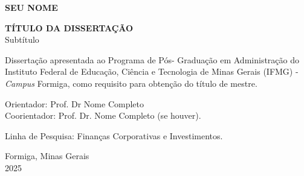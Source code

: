 \newpage




\thispagestyle{empty}

\begin{center}
  \vspace{3cm}
  \sc \large \textbf{SEU NOME} 
  
  \vspace{5cm}
  \large \textbf{TÍTULO DA DISSERTAÇÃO} \\
  Subtítulo
  
  \vspace{2cm}
  \begin{flushright}
  \begin{minipage}{0.6\textwidth}
  \small
  Dissertação apresentada ao Programa de Pós-
  Graduação em Administração do Instituto
  Federal de Educação, Ciência e
  Tecnologia de Minas Gerais (IFMG) -
  \textit{Campus} Formiga, como requisito para
  obtenção do título de mestre.
  \end{minipage}
  \end{flushright}
  
  \vspace{0.5cm}
  \begin{flushright}
  \small
  Orientador: Prof. Dr Nome Completo\\
  Coorientador: Prof. Dr. Nome Completo (se houver).
  
  \vspace{0.5cm}
  Linha de Pesquisa: Finanças Corporativas e Investimentos.
  \end{flushright}
  
  \vfill
  Formiga, Minas Gerais \\
  2025
\end{center}







\newpage





% 
% 





